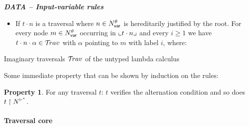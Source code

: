 \documentclass{article}
\theoremstyle{definition}
\newtheorem{property}{Property}[section]
\newcommand\Nodes{N}%
\newcommand\NodesVar{N_{\sf var}}%
\newcommand{\ghostlmd}{{\lambda\!\!\lambda}}
\newcommand{\ghostvar}{\theta}
\newcommand{\travulc}{\travset}
\newcommand{\enables}{\vdash} %
\newcommand{\NodeHjByRoot}{\Nodes^{\enables^*}} %
\begin{document}
\begin{FramedTable}
\emph{\bf DATA -- Input-variable rules}
\begin{itemize}
\item {} If $t \cdot n$ is a traversal where $n \in \NodesVar^\ghostvar$ is hereditarily justified by the root. For every node $m \in \NodesVar^\ghostvar$ occurring in $\llcorner t\cdot n \lrcorner$
and every $i\geq1$ we have $t \cdot n \cdot \alpha \in \travulc$ with $\alpha$ pointing to $m$ with label $i$, where:
\end{itemize}


\caption{Imaginary traversals $\travulc$ of the untyped lambda calculus}
 \label{tab:trav_rules}
\end{FramedTable}

Some immediate property that can be shown by induction on the rules:
\begin{property}
   For any traversal $t$: $t$ verifies the alternation condition and so does $t\filter\NodeHjByRoot$.
\end{property}

\paragraph{Traversal core}
\end{document}
